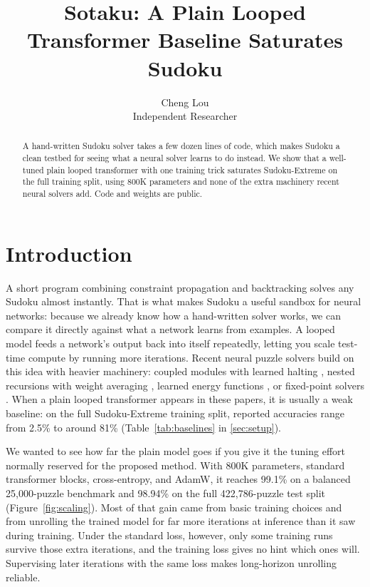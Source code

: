 \documentclass[10pt]{article}
\title{Sotaku: A Plain Looped Transformer Baseline Saturates Sudoku}
\author{Cheng Lou\\Independent Researcher}
\date{}
\newcommand{\figref}[1]{Figure~\ref{#1}}
\newcommand{\tabref}[1]{Table~\ref{#1}}
\begin{document}
\maketitle

\begin{abstract}
A hand-written Sudoku solver takes a few dozen lines of code, which makes Sudoku a clean testbed for seeing what a neural solver learns to do instead. We show that a well-tuned plain looped transformer with one training trick saturates Sudoku-Extreme on the full training split, using 800K parameters and none of the extra machinery recent neural solvers add. Code and weights are public.
\end{abstract}

\section{Introduction}

A short program combining constraint propagation and backtracking solves any Sudoku almost instantly. That is what makes Sudoku a useful sandbox for neural networks: because we already know how a hand-written solver works, we can compare it directly against what a network learns from examples. A looped model feeds a network's output back into itself repeatedly, letting you scale test-time compute by running more iterations. Recent neural puzzle solvers build on this idea with heavier machinery: coupled modules with learned halting \citep{wang2025hierarchical}, nested recursions with weight averaging \citep{jolicoeur2025less}, learned energy functions \citep{chen2026ebr}, or fixed-point solvers \citep{bai2019deep,huang2026eqr}. When a plain looped transformer appears in these papers, it is usually a weak baseline: on the full Sudoku-Extreme training split, reported accuracies range from 2.5\% to around 81\% (\tabref{tab:baselines} in \autoref{sec:setup}).

We wanted to see how far the plain model goes if you give it the tuning effort normally reserved for the proposed method. With 800K parameters, standard transformer blocks, cross-entropy, and AdamW, it reaches 99.1\% on a balanced 25,000-puzzle benchmark and 98.94\% on the full 422,786-puzzle test split (\figref{fig:scaling}). Most of that gain came from basic training choices and from unrolling the trained model for far more iterations at inference than it saw during training. Under the standard loss, however, only some training runs survive those extra iterations, and the training loss gives no hint which ones will. Supervising later iterations with the same loss makes long-horizon unrolling reliable.
\end{document}

